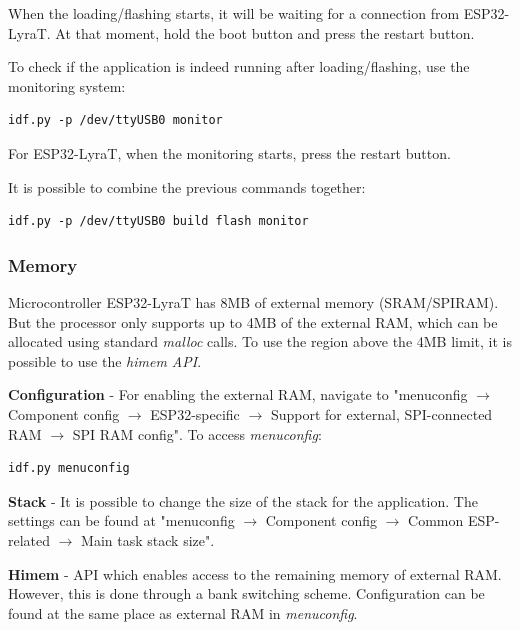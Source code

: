 \documentclass[thesis=M,english]{FITthesis}[2019/12/23]
\begin{document}
\bigskip
\noindent
When the loading/flashing starts, it will be waiting for a connection from ESP32-LyraT. At that moment, hold the boot button and press the restart button.

\bigskip
\noindent
To check if the application is indeed running after loading/flashing, use the monitoring system:
\begin{lstlisting}[frame=single]
idf.py -p /dev/ttyUSB0 monitor
\end{lstlisting}
For ESP32-LyraT, when the monitoring starts, press the restart button.

\bigskip
\noindent
It is possible to combine the previous commands together:
\begin{lstlisting}[frame=single]
idf.py -p /dev/ttyUSB0 build flash monitor
\end{lstlisting}

\subsubsection{Memory} \label{esp-memory}
Microcontroller ESP32-LyraT has 8MB of external memory (SRAM/SPIRAM). But the processor only supports up to 4MB of the external RAM, which can be allocated using standard \textit{malloc} calls. To use the region above the 4MB limit, it is possible to use the \textit{himem API}.

\bigskip
\noindent
\textbf{Configuration} - For enabling the external RAM, navigate to "menuconfig $\rightarrow$ Component config $\rightarrow$ ESP32-specific $\rightarrow$ Support for external, SPI-connected RAM $\rightarrow$ SPI RAM config". To access \textit{menuconfig}:
\begin{lstlisting}[frame=single]
idf.py menuconfig
\end{lstlisting}

\bigskip
\noindent
\textbf{Stack} - It is possible to change the size of the stack for the application. The settings can be found at "menuconfig $\rightarrow$ Component config $\rightarrow$ Common ESP-related $\rightarrow$ Main task stack size".

\bigskip
\noindent
\textbf{Himem} - API which enables access to the remaining memory of external RAM. However, this is done through a bank switching scheme. Configuration can be found at the same place as external RAM in \textit{menuconfig}.

\end{document}
